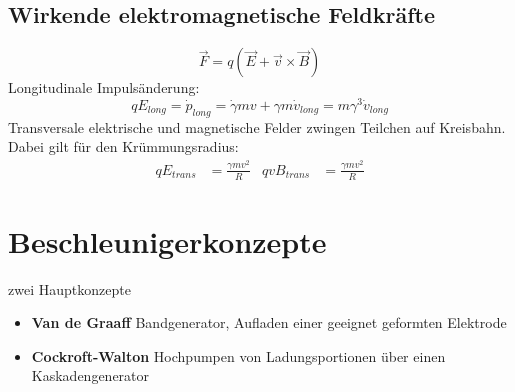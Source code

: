 \documentclass[12pt,DIV=15,a4paper,twoside,draft=false]{scrartcl}
\begin{document}
\subsection{Wirkende elektromagnetische Feldkräfte}
$$ \vec{F} = q (\vec{E} + \vec{v}\times \vec{B}) $$
Longitudinale Impulsänderung:
$$ qE_{long} = \dot{p}_{long} = \dot{γ} m v + γ m \dot{v}_{long} = m γ^3 \dot{v}_{long} $$
Transversale elektrische und magnetische Felder zwingen Teilchen auf Kreisbahn. Dabei gilt für den Krümmungsradius:
\begin{align*}
q E_{trans} &= \frac{γ m v^2}{R} &
q v B_{trans} &= \frac{γ m v^2}{R}
\end{align*}

\section{Beschleunigerkonzepte}
zwei Hauptkonzepte
\begin{itemize}
\item \textbf{Van de Graaff} Bandgenerator, Aufladen einer geeignet geformten Elektrode
\item \textbf{Cockroft-Walton} Hochpumpen von Ladungsportionen über einen Kaskadengenerator
\end{itemize}
\end{document}
